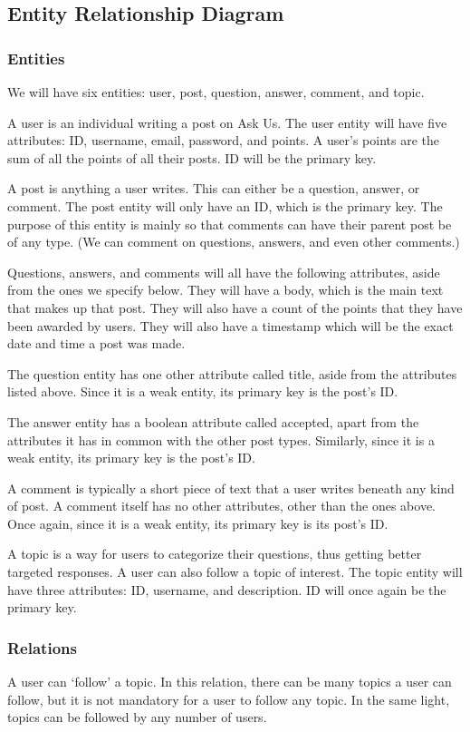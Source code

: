 \subsection{Entity Relationship Diagram}
\subsubsection{Entities}
We will have six entities: user, post, question, answer, comment, and topic.

A user is an individual writing a post on Ask Us. The user entity will have five attributes: ID, username, email, password, and points. A user's points are the sum of all the points of all their posts. ID will be the primary key.

A post is anything a user writes. This can either be a question, answer, or comment. The post entity will only have an ID, which is the primary key. The purpose of this entity is mainly so that comments can have their parent post be of any type. (We can comment on questions, answers, and even other comments.)

Questions, answers, and comments will all have the following attributes, aside from the ones we specify below. They will have a body, which is the main text that makes up that post. They will also have a count of the points that they have been awarded by users. They will also have a timestamp which will be the exact date and time a post was made.

The question entity has one other attribute called title, aside from the attributes listed above. Since it is a weak entity, its primary key is the post's ID.

The answer entity has a boolean attribute called accepted, apart from the attributes it has in common with the other post types. Similarly, since it is a weak entity, its primary key is the post's ID.

A comment is typically a short piece of text that a user writes beneath any kind of post. A comment itself has no other attributes, other than the ones above. Once again, since it is a weak entity, its primary key is its post's ID.

A topic is a way for users to categorize their questions, thus getting better targeted responses. A user can also follow a topic of interest. The topic entity will have three attributes: ID, username, and description. ID will once again be the primary key.

\subsubsection{Relations}
A user can `follow' a topic. In this relation, there can be many topics a user can follow, but it is not mandatory for a user to follow any topic. In the same light, topics can be followed by any number of users.

